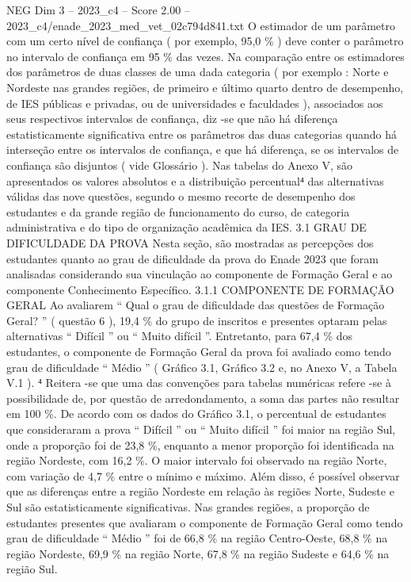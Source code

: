 \begin{textsample}{NEG Dim 3 – 2023\_c4 – Score 2.00 – 2023\_c4/enade\_2023\_med\_vet\_02c794d841.txt}
O estimador de um parâmetro com um certo nível de confiança ( por exemplo, 95,0 \% ) deve conter o parâmetro no intervalo de confiança em 95 \% das vezes.
Na comparação entre os estimadores dos parâmetros de duas classes de uma dada categoria ( por exemplo : Norte e Nordeste nas grandes regiões, de primeiro e último quarto dentro de desempenho, de IES públicas e privadas, ou de universidades e faculdades ), associados aos seus respectivos intervalos de confiança, diz -se que não há diferença estatisticamente significativa entre os parâmetros das duas categorias quando há interseção entre os intervalos de confiança, e que há diferença, se os intervalos de confiança são disjuntos ( vide Glossário ).
Nas tabelas do Anexo V, são apresentados os valores absolutos e a distribuição percentual⁴ das alternativas válidas das nove questões, segundo o mesmo recorte de desempenho dos estudantes e da grande região de funcionamento do curso, de categoria administrativa e do tipo de organização acadêmica da IES. 3.1 GRAU DE DIFICULDADE DA PROVA Nesta seção, são mostradas as percepções dos estudantes quanto ao grau de dificuldade da prova do Enade 2023 que foram analisadas considerando sua vinculação ao componente de Formação Geral e ao componente Conhecimento Específico. 3.1.1 COMPONENTE DE FORMAÇÃO GERAL Ao avaliarem “ Qual o grau de dificuldade das questões de Formação Geral? ” ( questão 6 ), 19,4 \% do grupo de inscritos e presentes optaram pelas alternativas “ Difícil ” ou “ Muito difícil ”.
Entretanto, para 67,4 \% dos estudantes, o componente de Formação Geral da prova foi avaliado como tendo grau de dificuldade “ Médio ” ( Gráfico 3.1, Gráfico 3.2 e, no Anexo V, a Tabela V.1 ). ⁴ Reitera -se que uma das convenções para tabelas numéricas refere -se à possibilidade de, por questão de arredondamento, a soma das partes não resultar em 100 \%.
De acordo com os dados do Gráfico 3.1, o percentual de estudantes que consideraram a prova “ Difícil ” ou “ Muito difícil ” foi maior na região Sul, onde a proporção foi de 23,8 \%, enquanto a menor proporção foi identificada na região Nordeste, com 16,2 \%.
O maior intervalo foi observado na região Norte, com variação de 4,7 \% entre o mínimo e máximo.
Além disso, é possível observar que as diferenças entre a região Nordeste em relação às regiões Norte, Sudeste e Sul são estatisticamente significativas.
Nas grandes regiões, a proporção de estudantes presentes que avaliaram o componente de Formação Geral como tendo grau de dificuldade “ Médio ” foi de 66,8 \% na região Centro-Oeste, 68,8 \% na região Nordeste, 69,9 \% na região Norte, 67,8 \% na região Sudeste e 64,6 \% na região Sul.

\end{textsample}
